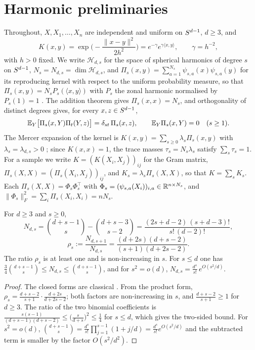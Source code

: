 \section{Harmonic preliminaries}\label{sec:prelim}

Throughout, $X,X_1,\dots,X_n$ are independent and uniform on $S^{d-1}$, $d\ge3$, and
\[
K(x,y)=\exp\Big(-\frac{\|x-y\|^2}{2h^2}\Big)=e^{-\gamma}e^{\gamma\langle x,y\rangle},\qquad \gamma=h^{-2},
\]
with $h>0$ fixed. We write $\mathcal H_{d,s}$ for the space of spherical harmonics of degree $s$ on
$S^{d-1}$, $N_s=N_{d,s}=\dim\mathcal H_{d,s}$, and $\Pi_s(x,y)=\sum_{a=1}^{N_s}\psi_{s,a}(x)\psi_{s,a}(y)$
for its reproducing kernel with respect to the uniform probability measure, so that
$\Pi_s(x,y)=N_sP_s(\langle x,y\rangle)$ with $P_s$ the zonal harmonic normalised by $P_s(1)=1$
\cite{AtkinsonHan}. The addition theorem gives $\Pi_s(x,x)=N_s$, and orthogonality of distinct degrees
gives, for every $x,z\in S^{d-1}$,
\begin{equation}
\mathbb{E}_Y\big[\Pi_s(x,Y)\Pi_t(Y,z)\big]=\delta_{st}\,\Pi_s(x,z),\qquad \mathbb{E}_Y\Pi_s(x,Y)=0\quad(s\ge1).
\label{eq:repro}
\end{equation}
The Mercer expansion of the kernel is $K(x,y)=\sum_{s\ge0}\lambda_s\Pi_s(x,y)$ with $\lambda_s=\lambda_{d,s}>0$
\cite{MinhNiyogiYao}; since $K(x,x)=1$, the trace masses $\tau_s=N_s\lambda_s$ satisfy $\sum_s\tau_s=1$.
For a sample we write $K=(K(X_i,X_j))_{ij}$ for the Gram matrix, $\Pi_s(X,X)=(\Pi_s(X_i,X_j))_{ij}$, and
$K_s=\lambda_s\Pi_s(X,X)$, so that $K=\sum_sK_s$. Each $\Pi_s(X,X)=\Phi_s\Phi_s^\top$ with
$\Phi_s=(\psi_{s,a}(X_i))_{i,a}\in\mathbb{R}^{n\times N_s}$, and $\|\Phi_s\|_F^2=\sum_i\Pi_s(X_i,X_i)=nN_s$.

\begin{lemma}\label{lem:mult}
For $d\ge3$ and $s\ge0$,
\[
N_{d,s}=\binom{d+s-1}{s}-\binom{d+s-3}{s-2}=\frac{(2s+d-2)\,(s+d-3)!}{s!\,(d-2)!},
\]
\[
\rho_s:=\frac{N_{d,s+1}}{N_{d,s}}=\frac{(d+2s)(d+s-2)}{(s+1)(d+2s-2)} .
\]
The ratio $\rho_s$ is at least one and is non-increasing in $s$. For $s\le d$ one has
$\tfrac34\binom{d+s-1}{s}\le N_{d,s}\le\binom{d+s-1}{s}$, and for $s^2=o(d)$,
$N_{d,s}=\frac{d^s}{s!}\,e^{O(s^2/d)}$.
\end{lemma}

\begin{proof}
The closed forms are classical \cite{AtkinsonHan}. From the product form,
$\rho_s=\frac{d+s-2}{s+1}\cdot\frac{d+2s}{d+2s-2}$; both factors are non-increasing in $s$, and
$\frac{d+s-2}{s+1}\ge1$ for $d\ge3$. The ratio of the two binomial coefficients is
$\frac{s(s-1)}{(d+s-1)(d+s-2)}\le\big(\frac{s}{d+s}\big)^2\le\frac14$ for $s\le d$, which gives the two-sided
bound. For $s^2=o(d)$, $\binom{d+s-1}{s}=\frac{d^s}{s!}\prod_{j=1}^{s-1}(1+j/d)=\frac{d^s}{s!}e^{O(s^2/d)}$
and the subtracted term is smaller by the factor $O(s^2/d^2)$.
\end{proof}

